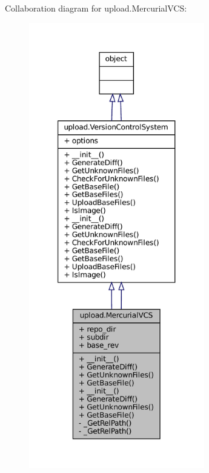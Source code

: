 Collaboration diagram for upload.\+Mercurial\+V\+CS\+:
\nopagebreak
\begin{figure}[H]
\begin{center}
\leavevmode
\includegraphics[height=550pt]{classupload_1_1MercurialVCS__coll__graph}
\end{center}
\end{figure}
